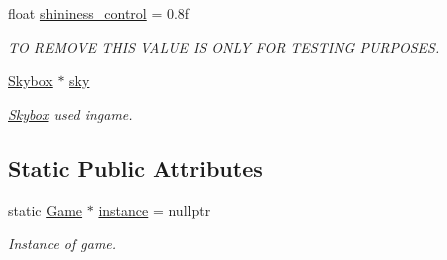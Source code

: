 \begin{DoxyCompactItemize}
\item 
float \mbox{\hyperlink{class_game_a91b5545f94ad9a83bac6d9be6ef15737}{shininess\+\_\+control}} = 0.\+8f
\begin{DoxyCompactList}\small\item\em TO R\+E\+M\+O\+VE T\+H\+IS V\+A\+L\+UE IS O\+N\+LY F\+OR T\+E\+S\+T\+I\+NG P\+U\+R\+P\+O\+S\+ES. \end{DoxyCompactList}\item 
\mbox{\hyperlink{class_skybox}{Skybox}} $\ast$ \mbox{\hyperlink{class_game_a46b9b13579445bc071f6cba24953b531}{sky}}
\begin{DoxyCompactList}\small\item\em \mbox{\hyperlink{class_skybox}{Skybox}} used ingame. \end{DoxyCompactList}\end{DoxyCompactItemize}
\subsection*{Static Public Attributes}
\begin{DoxyCompactItemize}
\item 
static \mbox{\hyperlink{class_game}{Game}} $\ast$ \mbox{\hyperlink{class_game_aa469cdc0a30f4fd2d6d99b23f4fbf257}{instance}} = nullptr
\begin{DoxyCompactList}\small\item\em Instance of game. \end{DoxyCompactList}\end{DoxyCompactItemize}

